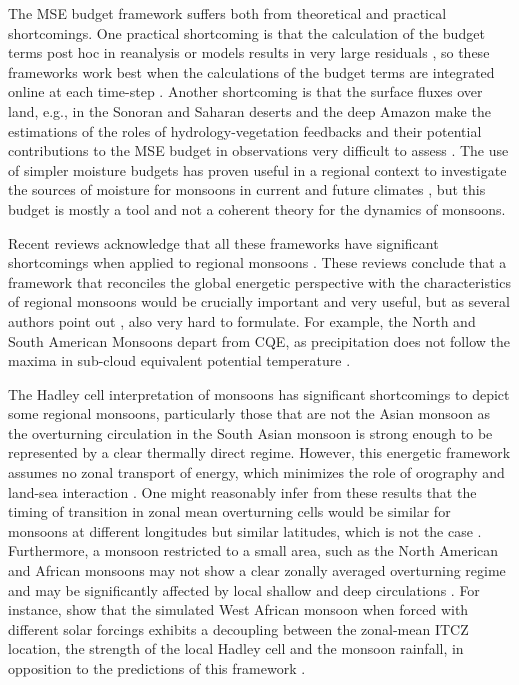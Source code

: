  The MSE budget framework suffers both from theoretical and practical shortcomings. One practical shortcoming is that the calculation of the budget terms post hoc in reanalysis or models results in very large residuals \citep{hill2019}, so these frameworks work best when the calculations of the budget terms are integrated online at each time-step \citep[e.g.][]{ma2019}.
Another shortcoming is that the surface fluxes over land, e.g., in the Sonoran and Saharan deserts and the deep Amazon make the estimations of the roles of hydrology-vegetation feedbacks and their potential contributions to the MSE budget in observations very difficult to assess \citep{boos2016,pascale2019}. The use of simpler moisture budgets has proven useful in a regional context to investigate the sources of moisture for monsoons in current  \citep{ordonez2019,martinez2019} and future climates \citep{smyth2020}, but this budget is mostly a tool and not a coherent theory for the dynamics of monsoons.

Recent reviews acknowledge that all these frameworks have significant shortcomings when applied to regional monsoons \citep{biasutti2018global,hill2019,geen2020}. These reviews conclude that a framework that reconciles the global energetic perspective with the characteristics of regional monsoons would be crucially important and very useful, but as several authors point out \citep[e.g.][]{biasutti2018global,hill2019}, also very hard to formulate. For example, the North and South American Monsoons depart from CQE, as precipitation does not follow the maxima in sub-cloud equivalent potential temperature \citep{nie2010observational,geen2020}. 

 
The Hadley cell interpretation of monsoons has significant shortcomings to depict some regional monsoons, particularly those that are not the Asian monsoon as the overturning circulation in the South Asian monsoon is strong enough to be represented by a clear thermally direct regime.
However, this energetic framework assumes no zonal transport of energy, which minimizes the role of orography and land-sea interaction \citep{biasutti2018global}.
One might reasonably infer from these results that the timing of transition in zonal mean overturning cells would be similar for monsoons at different longitudes but similar latitudes, which is not the case \citep{wang2017}.
Furthermore, a monsoon restricted to a small area, such as the North American and African monsoons may not show a clear zonally averaged overturning regime and may be significantly affected by local shallow and deep circulations \citep{zhai2015regime}. For instance, \cite{smyth2018simulated} show that the simulated West African monsoon when forced with different solar forcings exhibits a decoupling between the zonal-mean ITCZ location, the strength of the local Hadley cell and the monsoon rainfall, in opposition to the predictions of this framework \citep{bordoni2008monsoons}.


